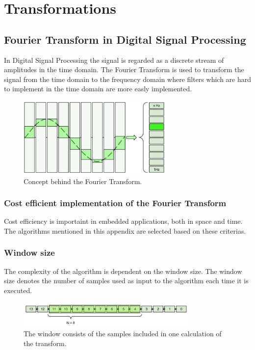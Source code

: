 \chapter{Transformations}
\section{Fourier Transform in Digital Signal Processing}\label{appendix:FT_in_DSP}

In Digital Signal Processing the signal is regarded as a discrete stream of amplitudes in the
time domain. The Fourier Transform is used to transform the signal from the time domain 
to the frequency domain where filters which are hard to implement in the time domain are
more easly implemented.

\begin{figure}[H]
    \centering
    \includegraphics[height=150px]{figures/theory/ft_conceptual}
    \caption{Concept behind the Fourier Transform.}
    \label{fig:ft_conceptual}
\end{figure}
\subsection{Cost efficient implementation of the Fourier Transform}

Cost efficiency is importaint in embedded applications, both in space and time. 
The algorithms mentioned in this appendix are selected based on these criterias.

\subsection{Window size}

The complexity of the algorithm is dependent on the window size. The window size
denotes the number of samples used as input to the algorithm each time it is executed.

\begin{figure}[H]
    \centering
    \includegraphics[height=50px]{figures/theory/dft_window}
    \caption{The window consists of the samples included in one calculation of the transform.}
    \label{fig:dft_window}
\end{figure}

